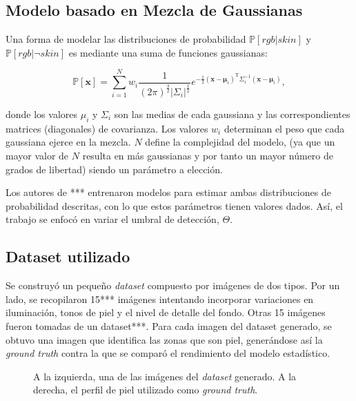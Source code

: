\documentclass[12pt]{article}
\begin{document}
\subsection{Modelo basado en Mezcla de Gaussianas}

Una forma de modelar las distribuciones de probabilidad  $\mathbb{P} [ rgb|skin
]$ y $\mathbb{P} [ rgb | \neg skin ]$ es mediante una suma de funciones
gaussianas:

\begin{equation}
    \mathbb{P}[\mathbf{x}] = \sum\limits_{i=1}^N w_i
    \frac{1}{(2\pi)^{\frac{3}{2}} | \Sigma_i |^\frac{1}{2}} e^{-\frac{1}{2}
    (\mathbf{x} - \mathbf{\mu}_i)^{\text{T}} \Sigma_i ^{-1} (\mathbf{x} -
    \mathbf{\mu}_i)},
\end{equation} 

donde los valores $\mu_i$ y $\Sigma_i$ son las medias de cada gaussiana y las
correspondientes matrices (diagonales) de covarianza. Los valores $w_i$
determinan el peso que cada gaussiana ejerce en la mezcla. $N$ define la
complejidad del modelo, (ya que un mayor valor de $N$ resulta en más gaussianas
y por tanto un mayor número de grados de libertad) siendo un parámetro a
elección. 

Los autores de \cite{fef}*** entrenaron modelos para estimar ambas
distribuciones de probabilidad descritas, con lo que estos parámetros tienen
valores dados. Así, el trabajo se enfocó en variar el umbral de detección,
$\Theta$.

\subsection{Dataset utilizado}

Se construyó un pequeño \emph{dataset} compuesto por imágenes de dos tipos. Por
un lado, se recopilaron 15*** imágenes intentando incorporar variaciones en
iluminación, tonos de piel y el nivel de detalle del fondo. Otras 15 imágenes
fueron tomadas de un dataset***. Para cada imagen del dataset generado, se
obtuvo una imagen que identifica las zonas que son piel, generándose así la
\emph{ground truth} contra la que se comparó el rendimiento del modelo
estadístico.


\begin{figure}[h]
    \centering
    \caption{A la izquierda, una de las imágenes del \emph{dataset} generado. A
    la derecha, el perfil de piel utilizado como \emph{ground truth}.}
\end{figure}
\end{document}

